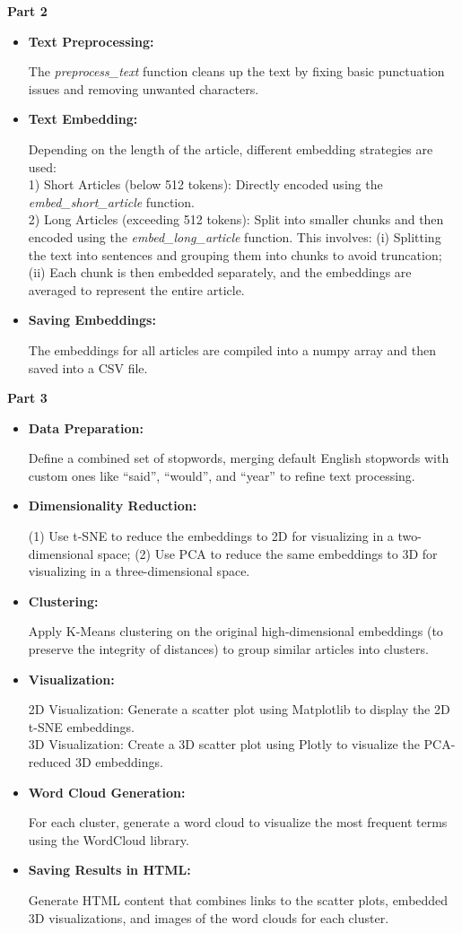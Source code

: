\documentclass{article}
\begin{document}
{\Large \textbf{Part 2}}
\begin{itemize}
\item \textbf{ Text Preprocessing:}

The\textit{ preprocess\_text} function cleans up the text by fixing basic punctuation issues and removing unwanted characters.
\item \textbf{ Text Embedding:}

Depending on the length of the article, different embedding strategies are used:\\
[0.5em]
1) Short Articles (below 512 tokens): Directly encoded using the \textit{embed\_short\_article} function.\\
[0.5em]
2) Long Articles (exceeding 512 tokens): Split into smaller chunks and then encoded using the \textit{embed\_long\_article} function. This involves: (i) Splitting the text into sentences and grouping them into chunks to avoid truncation; (ii) Each chunk is then embedded separately, and the embeddings are averaged to represent the entire article.
\item \textbf{ Saving Embeddings:}

The embeddings for all articles are compiled into a numpy array and then saved into a CSV file.\\
\end{itemize}

{\Large \textbf{Part 3}}
\begin{itemize}

\item \textbf{ Data Preparation:}

Define a combined set of stopwords, merging default English stopwords with custom ones like “said”, “would”, and “year” to refine text processing.
\item \textbf{ Dimensionality Reduction:}

(1) Use t-SNE to reduce the embeddings to 2D for visualizing in a two-dimensional space; (2) Use PCA to reduce the same embeddings to 3D for visualizing in a three-dimensional space.
\item \textbf{ Clustering:}

Apply K-Means clustering on the original high-dimensional embeddings (to preserve the integrity of distances) to group similar articles into clusters.
\item \textbf{ Visualization:}

2D Visualization: Generate a scatter plot using Matplotlib to display the 2D t-SNE embeddings. \\
3D Visualization: Create a 3D scatter plot using Plotly to visualize the PCA-reduced 3D embeddings.
\item \textbf{ Word Cloud Generation:}

For each cluster, generate a word cloud to visualize the most frequent terms using the WordCloud library.
\item \textbf{ Saving Results in HTML:}

Generate HTML content that combines links to the scatter plots, embedded 3D visualizations, and images of the word clouds for each cluster.\\
[0.5em]
\end{itemize}
\end{document}
